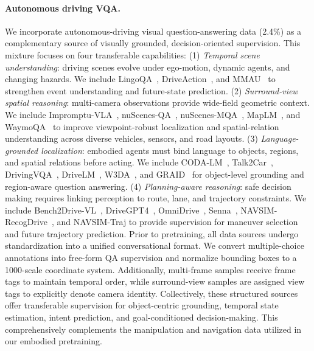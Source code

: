 \documentclass{llmxive}
\begin{document}
\paragraph{Autonomous driving VQA.}
We incorporate autonomous-driving visual question-answering data (2.4\%) as a complementary source of visually grounded, decision-oriented supervision. This mixture focuses on four transferable capabilities: (1) \emph{Temporal scene understanding}: driving scenes evolve under ego-motion, dynamic agents, and changing hazards. We include LingoQA~\citep{marcu2024lingoqa}, DriveAction~\citep{hao2025driveaction}, and MMAU~\citep{fang2024abductive} to strengthen event understanding and future-state prediction. 
(2) \emph{Surround-view spatial reasoning}: multi-camera observations provide wide-field geometric context. We include Impromptu-VLA~\citep{chiimpromptu}, nuScenes-QA~\citep{qian2024nuscenes}, nuScenes-MQA~\citep{inoue2024nuscenes}, MapLM~\citep{cao2024maplm}, and WaymoQA~\citep{yu2025waymoqa} to improve viewpoint-robust localization and spatial-relation understanding across diverse vehicles, sensors, and road layouts. 
(3) \emph{Language-grounded localization}: embodied agents must bind language to objects, regions, and spatial relations before acting. We include CODA-LM~\citep{chen2025automated}, Talk2Car~\citep{deruyttere2019talk2car}, DrivingVQA~\cite{corbiere2025retrieval}, DriveLM~\citep{sima2024drivelm}, W3DA~\citep{zhou2025towards}, and GRAID~\citep{elmaaroufi2025graid} for object-level grounding and region-aware question answering. 
(4) \emph{Planning-aware reasoning}: safe decision making requires linking perception to route, lane, and trajectory constraints. We include Bench2Drive-VL~\citep{jia2026bench2drive}, DriveGPT4~\citep{xu2024drivegpt4}, OmniDrive~\citep{wang2025omnidrive}, Senna~\citep{jiang2024senna}, NAVSIM-RecogDrive~\citep{li2025recogdrive}, and NAVSIM-Traj to provide supervision for maneuver selection and future trajectory prediction. 
Prior to pretraining, all data sources undergo standardization into a unified conversational format. We convert multiple-choice annotations into free-form QA supervision and normalize bounding boxes to a 1000-scale coordinate system. Additionally, multi-frame samples receive frame tags to maintain temporal order, while surround-view samples are assigned view tags to explicitly denote camera identity. Collectively, these structured sources offer transferable supervision for object-centric grounding, temporal state estimation, intent prediction, and goal-conditioned decision-making. This comprehensively complements the manipulation and navigation data utilized in our embodied pretraining.
\end{document}
